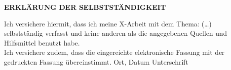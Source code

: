 \thispagestyle{empty}
\vspace*{2em}
\begin{center}
    \textbf{ERKLÄRUNG DER SELBSTSTÄNDIGKEIT}
\end{center}

Ich versichere hiermit, dass ich meine X-Arbeit mit dem Thema: (\ldots)\\
selbstständig verfasst und keine anderen als die angegebenen Quellen und Hilfsmittel benutzt habe.\\
Ich versichere zudem, dass die eingereichte elektronische Fassung mit der gedruckten Fassung übereinstimmt.
\vfill
Ort, Datum \hfill Unterschrift\hspace*{2cm}
\vspace*{5em}

